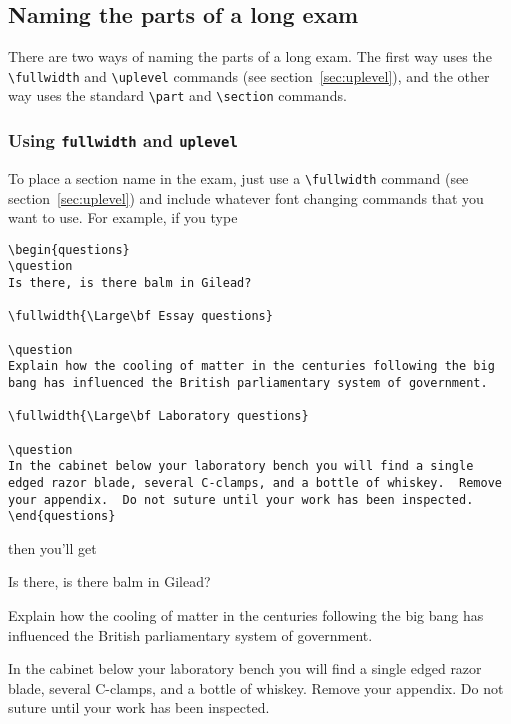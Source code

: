 \documentclass[12pt]{exam}
\begin{document}
\subsection{Naming the parts of a long exam}

There are two ways of naming the parts of a long exam.  The first way
uses the \verb"\fullwidth" and \verb"\uplevel" commands (see
section~\ref{sec:uplevel}), and the other way uses the standard
\verb"\part" and \verb"\section" commands.




\subsubsection{Using \texttt{fullwidth} and \texttt{uplevel}}

To place a section name in the exam, just use a \verb"\fullwidth"
command (see section~\ref{sec:uplevel}) and include whatever font
changing commands that you want to use.  For example, if you type
%
\begin{verbatim}
\begin{questions}
\question
Is there, is there balm in Gilead?

\fullwidth{\Large\bf Essay questions}

\question
Explain how the cooling of matter in the centuries following the big
bang has influenced the British parliamentary system of government.

\fullwidth{\Large\bf Laboratory questions}

\question
In the cabinet below your laboratory bench you will find a single
edged razor blade, several C-clamps, and a bottle of whiskey.  Remove
your appendix.  Do not suture until your work has been inspected.
\end{questions}
\end{verbatim}
%
then you'll get
%
\begin{questions}
\question
Is there, is there balm in Gilead?


\question
Explain how the cooling of matter in the centuries following the big
bang has influenced the British parliamentary system of government.


\question
In the cabinet below your laboratory bench you will find a single
edged razor blade, several C-clamps, and a bottle of whiskey.  Remove
your appendix.  Do not suture until your work has been inspected.
\end{questions}
\end{document}
